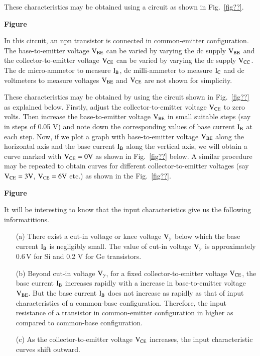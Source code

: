 These characteristics may be obtained using a circuit as shown in Fig.~\ref{fig??}.
\begin{center}
{\bf Figure}
\end{center}

In this circuit, an npn transistor is connected in common-emitter configuration. The base-to-emitter voltage $\textrm{V}_{\text{BE}}$ can be varied by varying the dc supply $\textrm{V}_{\text{BB}}$ and the collector-to-emitter voltage $\textrm{V}_{\text{CE}}$ can be varied by varying the dc supply $\textrm{V}_{\text{CC}}$. The dc micro-ammetor to measure $\textrm{I}_{\textrm{B}}$, dc milli-ammeter to measure $\textrm{I}_{\textrm{C}}$ and dc voltmeters to measure voltages $\textrm{V}_{\text{BE}}$ and $\textrm{V}_{\text{CE}}$ are not shown for simplicity.

 These characteristics may be obtained by using the circuit shown in Fig.~\ref{fig??} as explained below. Firstly, adjust the collector-to-emitter voltage $\textrm{V}_{\text{CE}}$ to zero volts. Then increase the base-to-emitter voltage $\textrm{V}_{\text{BE}}$ in small suitable steps (say in steps of 0.05 V) and note down the corresponding values of base current $\textrm{I}_{\textrm{B}}$ at each step. Now, if we plot a graph with base-to-emitter voltage $\textrm{V}_{\text{BE}}$ along the horizontal axis and the base current $\textrm{I}_{\textrm{B}}$ along the vertical axis, we will obtain a curve marked with $\textrm{V}_{\text{CE}}=0\textrm{V}$ as shown in Fig.~\ref{fig??} below. A similar procedure may be repeated to obtain curves for different collector-to-emitter voltages (say $\textrm{V}_{\text{CE}}=3\textrm{V}$, $\textrm{V}_{\text{CE}}=6\textrm{V}$ etc.) as shown in the Fig.~\ref{fig??}.
\begin{center}
{\bf Figure}
\end{center}

It will be interesting to know that the input characteristics give us the following informatitions.
\begin{itemize}
\item[(a)] There exist a cut-in voltage or knee voltage $\textrm{V}_{\gamma}$ below which the base current $\textrm{I}_{\textrm{B}}$ is negligibly small. The value of cut-in voltage $\textrm{V}_{\gamma}$ is approximately 0.6\,V for Si and 0.2 V for Ge transistors.

\item[(b)] Beyond cut-in voltage $\textrm{V}_{\gamma}$, for a fixed collector-to-emitter voltage $\textrm{V}_{\text{CE}}$, the base current $\textrm{I}_{\textrm{B}}$ increases rapidly with a increase in base-to-emitter voltage $\textrm{V}_{\text{BE}}$. But the base current $\textrm{I}_{\textrm{B}}$ does not increase as rapidly as that of input characteristics of a common-base configuration. Therefore, the input resistance of a transistor in common-emitter configuration in higher as compared to common-base configuration.

\item[(c)] As the collector-to-emitter voltage $\textrm{V}_{\text{CE}}$ increases, the input characteristic curves shift outward.
\end{itemize}

